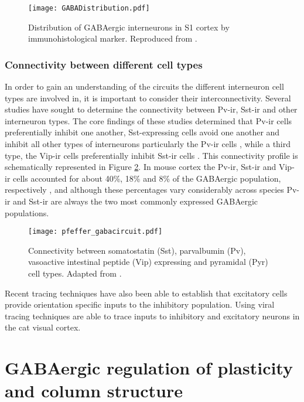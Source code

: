 \begin{figure}
	\centering
        \texttt{[image: GABADistribution.pdf]}
	\caption{Distribution of GABAergic interneurons in S1 cortex by
      immunohistological marker. Reproduced from \cite{Rudy2011}.}
	\label{GABADistribution}
\end{figure}


\subsubsection{Connectivity between different cell types}

In order to gain an understanding of the circuits the different
interneuron cell types are involved in, it is important to consider
their interconnectivity. Several studies have sought to determine the
connectivity between Pv-ir, Sst-ir and other interneuron types. The
core findings of these studies determined that Pv-ir cells
preferentially inhibit one another, Sst-expressing cells avoid one
another and inhibit all other types of interneurons particularly the
Pv-ir cells \citep{Xu2013}, while a third type, the Vip-ir cells
preferentially inhibit Sst-ir cells \citep{Pfeffer2013}. This
connectivity profile is schematically represented in Figure
\ref{gaba_circuit}. In mouse cortex the Pv-ir, Sst-ir and Vip-ir cells
accounted for about 40\%, 18\% and 8\% of the GABAergic population,
respectively \citep{Xu2010}, and although these percentages vary
considerably across species Pv-ir and Sst-ir are always the two most
commonly expressed GABAergic populations.

\begin{figure}
	\centering
        \texttt{[image: pfeffer\_gabacircuit.pdf]}
	\caption{Connectivity between somatostatin (Sst),
        parvalbumin (Pv), vasoactive intestinal peptide (Vip)
        expressing and pyramidal (Pyr) cell types. Adapted from
        \cite{Pfeffer2013}.}
	\label{gaba_circuit}
\end{figure}

Recent tracing techniques have also been able to establish that
excitatory cells provide orientation specific inputs to the inhibitory
population. Using viral tracing techniques \cite{Liu2013} are able to
trace inputs to inhibitory and excitatory neurons in the cat visual
cortex.

\section{GABAergic regulation of plasticity and column structure}

